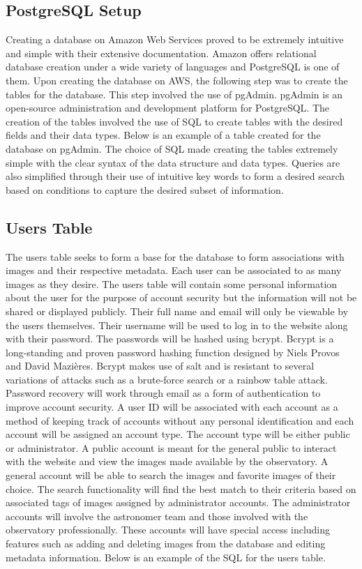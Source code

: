 \documentclass[12pt]{article}
\begin{document}
\subsection{PostgreSQL Setup}

Creating a database on Amazon Web Services proved to be extremely intuitive and simple with their extensive documentation.  Amazon offers relational database creation under a wide variety of languages and PostgreSQL is one of them.  Upon creating the database on AWS, the following step was to create the tables for the database.  This step involved the use of pgAdmin.  pgAdmin is an open-source administration and development platform for PostgreSQL.\cite{pgadmin}  The creation of the tables involved the use of SQL to create tables with the desired fields and their data types.  Below is an example of a table created for the database on pgAdmin.  The choice of SQL made creating the tables extremely simple with the clear syntax of the data structure and data types.  Queries are also simplified through their use of intuitive key words to form a desired search based on conditions to capture the desired subset of information.

\subsection{Users Table}

The users table seeks to form a base for the database to form associations with images and their respective metadata.  Each user can be associated to as many images as they desire.  The users table will contain some personal information about the user for the purpose of account security but the information will not be shared or displayed publicly.  Their full name and email will only be viewable by the users themselves.  Their username will be used to log in to the website along with their password.  The passwords will be hashed using bcrypt.  Bcrypt is a long-standing and proven password hashing function designed by Niels Provos and David Mazières.  Bcrypt makes use of salt and is resistant to several variations of attacks such as a brute-force search or a rainbow table attack.  Password recovery will work through email as a form of authentication to improve account security.
A user ID will be associated with each account as a method of keeping track of accounts without any personal identification and each account will be assigned an account type.  The account type will be either public or administrator.  A public account is meant for the general public to interact with the website and view the images made available by the observatory.  A general account will be able to search the images and favorite images of their choice.  The search functionality will find the best match to their criteria based on associated tags of images assigned by administrator accounts.  The administrator accounts will involve the astronomer team and those involved with the observatory professionally.  These accounts will have special access including features such as adding and deleting images from the database and editing metadata information.
Below is an example of the SQL for the users table.
\end{document}
